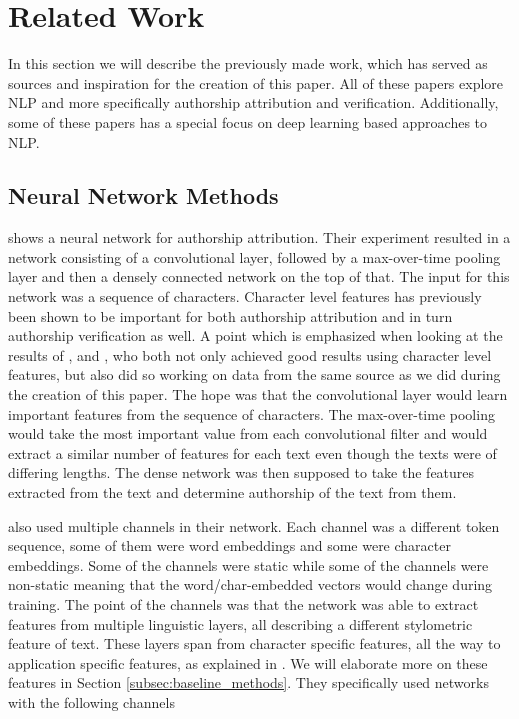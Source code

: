\section{Related Work} \label{sec:related_work}


In this section we will describe the previously made work,
which has served as sources and inspiration for the creation of this paper.
All of these papers explore \gls{NLP} and more specifically authorship
attribution and verification. Additionally, some of these papers has a
special focus on deep learning based approaches to \gls{NLP}.

\subsection{Neural Network Methods}

\citet{DBLP:journals/corr/RuderGB16c} shows a neural network for authorship
attribution. Their experiment resulted in a network consisting of a
convolutional layer, followed by a max-over-time pooling layer and then a
densely connected network on the top of that. The input for this network
was a sequence of characters. Character level features has previously been
shown to be important for both authorship attribution and in turn authorship
verification as well. A point which is emphasized when looking at the results
of \citet{hansen2014}, and \citet{aalykke2016}, who both not only achieved good
results using character level features, but also did so working on data from
the same source as we did during the creation of this paper. The hope was that
the convolutional layer would learn important features from the sequence of
characters. The max-over-time pooling would take the most important value from
each convolutional filter and would extract a similar number of features for
each text even though the texts were of differing lengths. The dense network
was then supposed to take the features extracted from the text and determine
authorship of the text from them.

\citet{DBLP:journals/corr/RuderGB16c} also used multiple channels in their
network. Each channel was a different token sequence, some of them were word
embeddings and some were character embeddings. Some of the channels were static
while some of the channels were non-static meaning that the word/char-embedded
vectors would change during training. The point of the channels was that the
network was able to extract features from multiple linguistic layers, all
describing a different stylometric feature of text. These layers span from
character specific features, all the way to application specific features,
as explained in \citet[Section 2]{stamatos2009}. We will elaborate more on
these features in Section \ref{subsec:baseline_methods}. They specifically used
networks with the following channels

